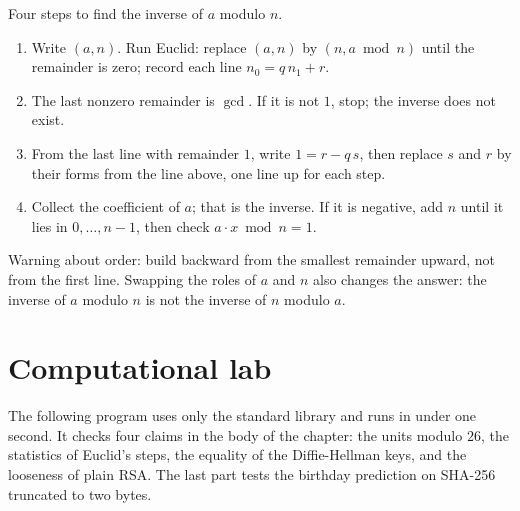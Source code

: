 \begin{resep}
Four steps to find the inverse of $a$ modulo $n$.
\begin{enumerate}
  \item Write $(a,n)$. Run Euclid: replace $(a,n)$ by $(n,a\bmod n)$ until the remainder is zero;
        record each line $n_0=q\,n_1+r$.
  \item The last nonzero remainder is $\gcd$. If it is not $1$, stop; the inverse does not exist.
  \item From the last line with remainder $1$, write $1=r-q\,s$, then replace $s$ and $r$ by their
        forms from the line above, one line up for each step.
  \item Collect the coefficient of $a$; that is the inverse. If it is negative, add $n$ until it lies
        in $0,\dots,n-1$, then check $a\cdot x\bmod n=1$.
\end{enumerate}
Warning about order: build backward from the smallest remainder upward, not from the first line.
Swapping the roles of $a$ and $n$ also changes the answer: the inverse of $a$ modulo $n$ is not the
inverse of $n$ modulo $a$.
\end{resep}


\section{Computational lab}

The following program uses only the standard library and runs in under one second. It checks four
claims in the body of the chapter: the units modulo $26$, the statistics of Euclid's steps, the
equality of the Diffie-Hellman keys, and the looseness of plain RSA. The last part tests the birthday
prediction on SHA-256 truncated to two bytes.

